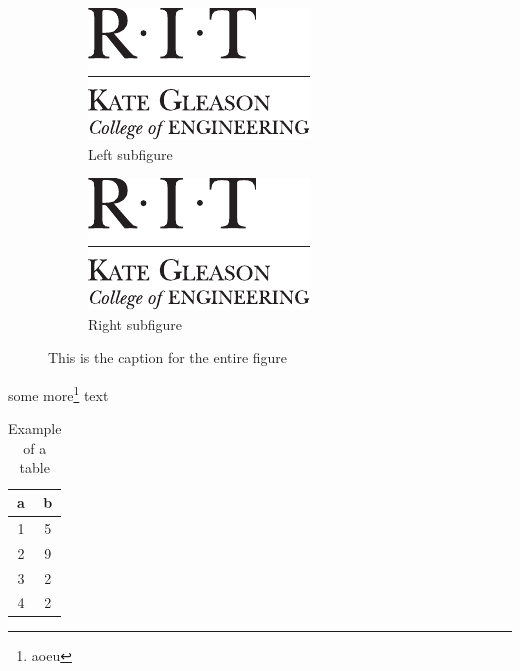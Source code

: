 \documentclass[microe]{ritthesis}
\begin{document}
\begin{figure}
\centering
\begin{subfigure}{0.25\linewidth}
\centering
\includegraphics[width=\linewidth]{kgcoelogovert}
\caption{Left subfigure}
\label{fig:sub:left}
\end{subfigure}
\quad\quad\quad\quad
\begin{subfigure}{0.25\linewidth}
\centering
\includegraphics[width=\linewidth]{kgcoelogovert}
\caption{Right subfigure}
\label{fig:sub:right}
\end{subfigure}
\caption{This is the caption for the entire figure}
\label{fig:sub}
\end{figure}

some more\footnote{aoeu} text

\begin{table}
\centering
\caption{Example of a table}
\label{tab:samp}
\begin{tabular}{cc}
\toprule
a		& b\\
\midrule
1		& 5\\
2		& 9\\
3		& 2\\
4		& 2\\
\bottomrule
\end{tabular}
\end{table}
\end{document}
